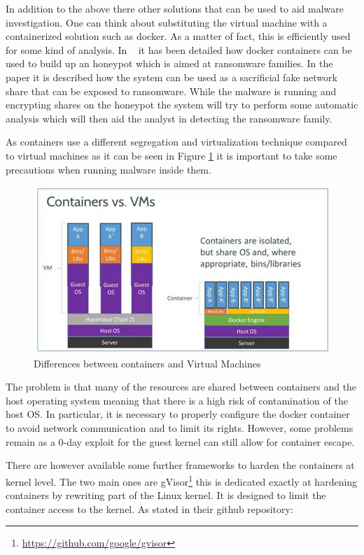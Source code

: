 In addition to the above there other solutions that can be used to aid malware investigation. One can think about substituting the virtual machine with a containerized solution such as docker. As a matter of fact, this is efficiently used for some kind of analysis. In ~\cite{9042158} it has been detailed how docker containers can be used to build up an honeypot which is aimed at ransomware families. In the paper it is described how the system can be used as a sacrificial fake network share that can be exposed to ransomware. While the malware is running and encrypting shares on the honeypot the system will try to perform some automatic analysis which will then aid the analyst in detecting the ransomware family.

As containers use a different segregation and virtualization technique compared to virtual machines as it can be seen in Figure \ref{fig:dockvm} it is important to take some precautions when running malware inside them. 

\begin{figure}[htp]
\centering
\includegraphics[width=\linewidth]{images/dockervm.png}
\caption{Differences between containers and Virtual Machines}
\label{fig:dockvm}
\end{figure}

The problem is that many of the resources are shared between containers and the host operating system meaning that there is a high risk of contamination of the host OS. In particular, it is necessary to properly configure the docker container to avoid network communication and to limit its rights. However, some problems remain as a 0-day exploit for the guest kernel can still allow for container escape. 

There are however available some further frameworks to harden the containers at kernel level. The two main ones are gVisor\footnote{\url{https://github.com/google/gvisor}} this is dedicated exactly at hardening containers by rewriting part of the Linux kernel. It is designed to limit the container access to the kernel. As stated in their github repository:

